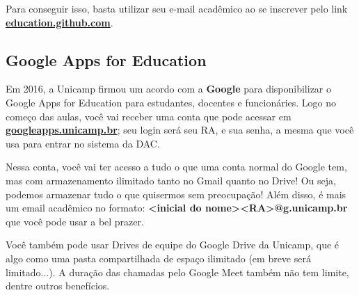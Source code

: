 Para conseguir isso, basta utilizar seu e-mail acadêmico ao se inscrever pelo link \textbf{\url{education.github.com}}.

\subsection{Google Apps for Education}

Em 2016, a Unicamp firmou um acordo com a \textbf{Google} para disponibilizar o Google  Apps for Education para estudantes, docentes e funcionáries. Logo no começo das aulas,  você vai receber uma conta que pode acessar em \textbf{\url{googleapps.unicamp.br}}; seu login será  seu RA, e sua senha, a mesma que você usa para entrar no sistema da DAC.

Nessa conta, você vai ter acesso a tudo o que uma conta normal do Google tem, mas  com armazenamento ilimitado tanto no Gmail quanto no Drive! Ou seja, podemos  armazenar tudo o que quisermos sem preocupação! Além disso, é mais um email  acadêmico no formato: \textbf{<inicial do nome><RA>@g.unicamp.br} que você pode usar a bel prazer.

Você também pode usar Drives de equipe do Google Drive da Unicamp, que é algo  como uma pasta compartilhada de espaço ilimitado (em breve será limitado...). A  duração das chamadas pelo Google Meet também não tem limite, dentre outros  benefícios.
